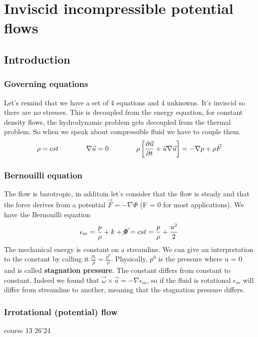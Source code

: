 
\chapter{Inviscid incompressible potential flows}

\section{Introduction}
	\subsection{Governing equations}
		Let's remind that we have a set of 4 equations and 4 unknowns. It's inviscid so there are no stresses. This is decoupled from the energy equation, for constant density flows, the hydrodynamic problem gets decoupled from the thermal problem. So when we speak about compressible fluid we have to couple them. 
		\begin{equation}
			\rho = cst \qquad\qquad \nabla \vec{u} = 0 \qquad\qquad \rho \left[\frac{\D \vec{u}}{\D t} + \vec{u} \nabla \vec{u} \right] = -\nabla p +\rho \vec{F}
		\end{equation}
		
	\subsection{Bernouilli equation}
		The flow is barotropic, in additoin let's consider that the flow is steady and that the force derives from a potential $\vec{F} = -\nabla \Phi$ (F = 0 for most applications). We have the Bernouilli equation
		\begin{equation}
			\epsilon _m = \frac{p}{\rho}+k + \cancel{\Phi} = cst = \frac{p}{\rho} +\frac{u^2}{2}
		\end{equation}
		The mechanical energy is constant on a streamline. We can give an interpretation to the constant by calling it $\frac{p_t}{\rho} = \frac{p^0}{\rho}$. Physically, $p^0$ is the pressure where u = 0 and is called \textbf{stagnation pressure}. The constant differs from constant to constant. Indeed we found that $\vec{\omega}\times \vec{u} = -\nabla \epsilon _m$, so if the fluid is rotational $\epsilon _m$ will differ from streamline to another, meaning that the stagnation pressure differs. 
		
	\subsection{Irrotational (potential) flow}
		course 13 26'24